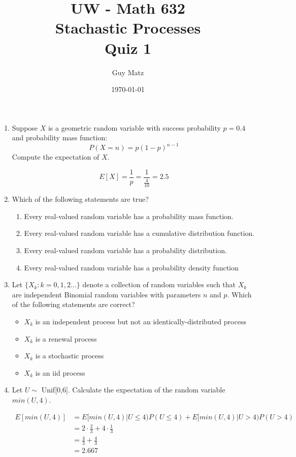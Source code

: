 \documentclass[10pt]{article}
\title{UW - Math 632 \\
Stachastic Processes \\
Quiz 1}
\author{Guy Matz}
\date{\today}
\begin{document}
\begin{enumerate}
  \item Suppose $X$ is a geometric random variable with success
    probability $p=0.4$ and probability mass function:
    \[ P(X=n)=p(1-p)^{n-1} \]
    Compute the expectation of $X$.

    \[ E[X] = \frac{1}{p} = \frac{1}{\frac{4}{10} } = 2.5   \]

\newpage

  \item Which of the following statements are true?
    \begin{enumerate}
      \item Every real-valued random variable has a probability mass function.
      \item Every real-valued random variable has a cumulative distribution function. \checkmark
      \item Every real-valued random variable has a probability distribution. \checkmark
      \item Every real-valued random variable has a probability density function
    \end{enumerate}

\newpage

  \item Let $\{ X_k : k = 0,1,2 \dots \}$ denote a collection of random
    variables such that $X_k$ are independent Binomial random variables
    with parameters $n$ and $p$.
    Which of the following statements are correct?
    \begin{itemize}
		\item $X_k$ is an independent process but not an identically-distributed process
		\item $X_k$ is a renewal process
		\item $X_k$ is a stochastic process \checkmark
		\item $X_k$ is an iid process \checkmark
    \end{itemize}

\newpage

  \item Let $U \sim$ Unif[0,6]. Calculate the expectation of the random
    variable $min(U, 4)$.

    \begin{align*}
      E[min(U, 4)] &= E[min(U, 4) | U \leq 4)P(U \leq 4) +
                              E[min(U,4) | U > 4)P(U > 4) \\
                   &= 2 \cdot  \frac{2}{3} + 4 \cdot  \frac{1}{3}  \\
                   &= \frac{4}{3} + \frac{4}{3}  \\
                   &= 2.667
    \end{align*}


\end{enumerate}
\end{document}
